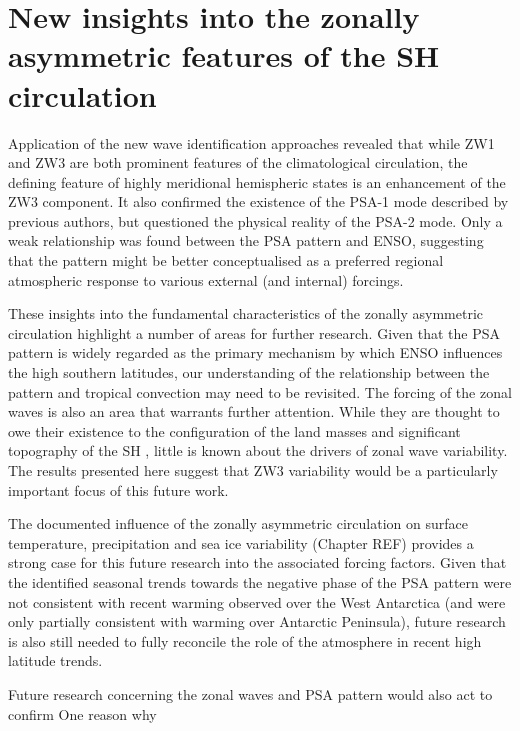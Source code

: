 

\section{New insights into the zonally asymmetric features of the SH circulation}

Application of the new wave identification approaches revealed that while ZW1 and ZW3 are both prominent features of the climatological circulation, the defining feature of highly meridional hemispheric states is an enhancement of the ZW3 component. It also confirmed the existence of the PSA-1 mode described by previous authors, but questioned the physical reality of the PSA-2 mode. Only a weak relationship was found between the PSA pattern and ENSO, suggesting that the pattern might be better conceptualised as a preferred regional atmospheric response to various external (and internal) forcings. 

These insights into the fundamental characteristics of the zonally asymmetric circulation highlight a number of areas for further research. Given that the PSA pattern is widely regarded as the primary mechanism by which ENSO influences the high southern latitudes, our understanding of the relationship between the pattern and tropical convection may need to be revisited. The forcing of the zonal waves is also an area that warrants further attention. While they are thought to owe their existence to the configuration of the land masses and significant topography of the SH \citep{Baines1989}, little is known about the drivers of zonal wave variability. The results presented here suggest that ZW3 variability would be a particularly important focus of this future work.  

The documented influence of the zonally asymmetric circulation on surface temperature, precipitation and sea ice variability (Chapter REF) provides a strong case for this future research into the associated forcing factors. Given that the identified seasonal trends towards the negative phase of the PSA pattern were not consistent with recent warming observed over the West Antarctica (and were only partially consistent with warming over Antarctic Peninsula), future research is also still needed to fully reconcile the role of the atmosphere in recent high latitude trends. 

Future research concerning the zonal waves and PSA pattern would also act to confirm 
One reason why 



